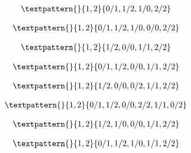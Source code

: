 \begin{equation}
	\begin{gathered}
		\textpattern{}{1,2}{0/1,1/2,1/0,2/2}
	\end{gathered}
	\label{cls:102}
\end{equation}

\begin{equation}
	\begin{gathered}
		\textpattern{}{1,2}{0/1,1/2,1/0,0/0,2/2}
	\end{gathered}
	\label{cls:103}
\end{equation}

\begin{equation}
	\begin{gathered}
		\textpattern{}{1,2}{1/2,0/0,1/1,2/2}
	\end{gathered}
	\label{cls:104}
\end{equation}

\begin{equation}
	\begin{gathered}
		\textpattern{}{1,2}{0/1,1/2,0/0,1/1,2/2}
	\end{gathered}
	\label{cls:105}
\end{equation}

\begin{equation}
	\begin{gathered}
		\textpattern{}{1,2}{1/2,0/0,0/2,1/1,2/2}
	\end{gathered}
	\label{cls:106}
\end{equation}

\begin{equation}
	\begin{gathered}
		\textpattern{}{1,2}{0/1,1/2,0/0,2/2,1/1,0/2}
	\end{gathered}
	\label{cls:107}
\end{equation}

\begin{equation}
	\begin{gathered}
		\textpattern{}{1,2}{1/2,1/0,0/0,1/1,2/2}
	\end{gathered}
	\label{cls:108}
\end{equation}

\begin{equation}
	\begin{gathered}
		\textpattern{}{1,2}{0/1,1/2,1/0,1/1,2/2}
	\end{gathered}
	\label{cls:109}
\end{equation}

